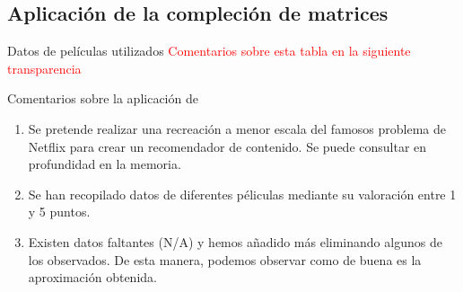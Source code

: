 \documentclass{beamer}
\begin{document}
\subsection{Aplicación de la compleción de matrices}
\begin{frame}{Datos de películas utilizados}
\vskip 0.3cm
\textcolor{red}{Comentarios sobre esta tabla en la siguiente transparencia}
    
\end{frame}

\begin{frame}{Comentarios sobre la aplicación de }
\begin{enumerate}
    \color{red}
    \item Se pretende realizar una recreación a menor escala del famosos problema de Netflix para crear un recomendador de contenido. Se puede consultar en profundidad en la memoria.
    \item Se han recopilado datos de diferentes péliculas mediante su valoración entre 1 y 5 puntos.
    \item Existen datos faltantes (N/A) y hemos añadido más eliminando algunos de los observados. De esta manera, podemos observar como de buena es la aproximación obtenida.
\end{enumerate}
    
\end{frame}
\end{document}
